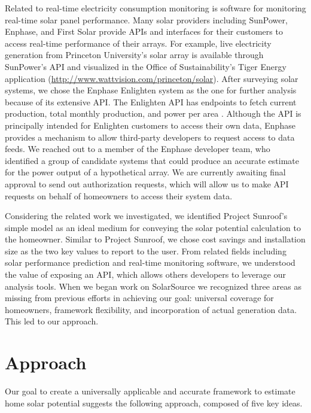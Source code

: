 \documentclass[pageno]{jpaper}
\begin{document}
Related to real-time electricity consumption monitoring is software for monitoring real-time solar panel performance. Many solar providers including SunPower, Enphase, and First Solar provide APIs and interfaces for their customers to access real-time performance of their arrays. For example, live electricity generation from Princeton University's solar array is available through SunPower's API and visualized in the Office of Sustainability's Tiger Energy application (\url{http://www.wattvision.com/princeton/solar}). After surveying solar systems, we chose the Enphase Enlighten system as the one for further analysis because of its extensive API. The Enlighten API has endpoints to fetch current production, total monthly production, and power per area \cite{Enlighten}. Although the API is principally intended for Enlighten customers to access their own data, Enphase provides a mechanism to allow third-party developers to request access to data feeds. We reached out to a member of the Enphase developer team, who identified a group of candidate systems that could produce an accurate estimate for the power output of a hypothetical array. We are currently awaiting final approval to send out authorization requests, which will allow us to make API requests on behalf of homeowners to access their system data.

Considering the related work we investigated, we identified Project Sunroof's simple model as an ideal medium for conveying the solar potential calculation to the homeowner. Similar to Project Sunroof, we chose cost savings and installation size as the two key values to report to the user. From related fields including solar performance prediction and real-time monitoring software, we understood the value of exposing an API, which allows others developers to leverage our analysis tools. When we began work on SolarSource we recognized three areas as missing from previous efforts in achieving our goal: universal coverage for homeowners, framework flexibility, and incorporation of actual generation data. This led to our approach.

\bigskip
\bigskip

\section{Approach}
Our goal to create a universally applicable and accurate framework to estimate home solar potential suggests the following approach, composed of five key ideas.
\end{document}
